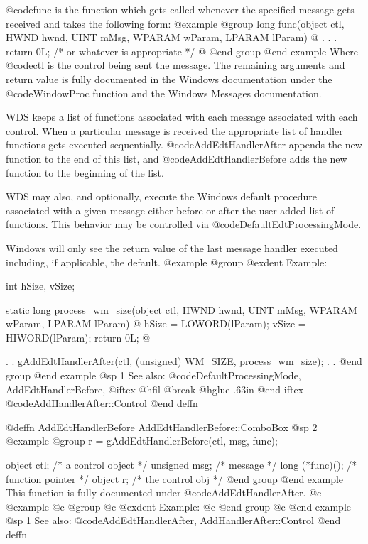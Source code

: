@code{func} is the function which gets called whenever the specified
message gets received and takes the following form:
@example
@group
long    func(object     ctl,
             HWND       hwnd, 
             UINT       mMsg, 
             WPARAM     wParam, 
             LPARAM     lParam)
@{
        .
        .
        .
        return 0L;  /* or whatever is appropriate  */
@}
@end group
@end example
Where @code{ctl} is the control being sent the message.  The remaining
arguments and return value is fully documented in the Windows documentation
under the @code{WindowProc} function and the Windows Messages documentation.

WDS keeps a list of functions associated with each message associated
with each control.  When a particular message is received the appropriate
list of handler functions gets executed sequentially.
@code{AddEdtHandlerAfter} appends the new function to the end of this list,
and @code{AddEdtHandlerBefore} adds the new function to the beginning of
the list.

WDS may also, and optionally, execute the Windows default procedure
associated with a given message either before or after the user added
list of functions.  This behavior may be controlled via
@code{DefaultEdtProcessingMode}.

Windows will only see the return value of the last message handler executed
including, if applicable, the default.
@example
@group
@exdent Example:

int     hSize, vSize;

static  long    process_wm_size(object  ctl, 
                                HWND    hwnd, 
                                UINT    mMsg, 
                                WPARAM  wParam, 
                                LPARAM  lParam)
@{
        hSize = LOWORD(lParam);
        vSize = HIWORD(lParam);
        return 0L;
@}

        .
        .
        gAddEdtHandlerAfter(ctl, (unsigned) WM_SIZE,
                                       process_wm_size);
        .
        .
@end group
@end example
@sp 1
See also:  @code{DefaultProcessingMode, AddEdtHandlerBefore,}
@iftex
@hfil @break @hglue .63in 
@end iftex
@code{AddHandlerAfter::Control}
@end deffn






@deffn {AddEdtHandlerBefore} AddEdtHandlerBefore::ComboBox
@sp 2
@example
@group
r = gAddEdtHandlerBefore(ctl, msg, func);

object   ctl;      /*  a control object  */
unsigned msg;      /*  message           */
long    (*func)(); /*  function pointer  */
object  r;         /*  the control obj   */
@end group
@end example
This function is fully documented under @code{AddEdtHandlerAfter}.
@c @example
@c @group
@c @exdent Example:
@c @end group
@c @end example
@sp 1
See also:  @code{AddEdtHandlerAfter, AddHandlerAfter::Control}
@end deffn













